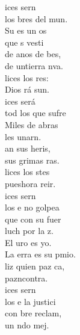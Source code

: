 \documentclass[12pt]{article}
\begin{document}
\begin{multicols*}{2}
\begin{cancion}%
	ices sern\\
	los bres del mun.\\
	Su  es un os\\
	que s vesti \\
	de anos de bes,\\
	de untierra nva.\\
	lices los res:\\
	Dios rá sun.\\
\jump
	ices será\\
	tod los que sufre\\
	Miles de abras\\
	les unarn.\\
	an sus heris,\\
	sus grimas ras. \\
	lices los stes\\
	pueshora reir.\\
\jump
	ices sern\\
	los e no golpea\\
	 que con su fuer\\
	luch por la z.\\
	El uro es yo.\\
	La erra es su pmio.\\
	liz quien paz ca,\\
	pazncontra.\\
\jump
	ices sern\\
	los e la justici\\
	con bre reclam,\\
	un ndo mej.\\

\end{cancion}
\end{multicols*}
\end{document}
